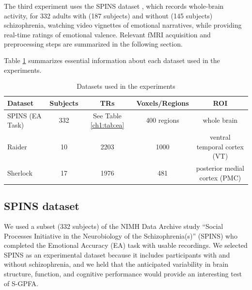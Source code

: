 The third experiment uses the SPINS dataset \cite{spins}, which records whole-brain activity, for 332 adults with (187 subjects) and without (145 subjects) schizophrenia, watching video vignettes of emotional narratives, while providing real-time ratings of emotional valence. Relevant fMRI acquisition and preprocessing steps are summarized in the following section.  

Table \ref{ch1:tab:datasets} summarizes essential information about each dataset used in the experiments.

\begin{table}[h!]
    \caption{Datasets used in the experiments}
    \label{ch1:tab:datasets}
    \centering \small
    \begin{tabular}{lcccc}
        \toprule
        \cmidrule(r){1-2}
        Dataset & Subjects  & TRs   & Voxels/Regions    & ROI\\
        \midrule
        SPINS (EA Task) \cite{spins} & 332   & See Table \ref{ch1:tab:ea}  & 400 regions \cite{schaefer2018local}  & whole brain \\
        Raider \cite{ha}  & 10    & 2203  & 1000   & ventral temporal cortex (VT) \\
        Sherlock\cite{sherlock}  & 17  & 1976   & 481 & posterior medial cortex (PMC) \\
        \bottomrule
    \end{tabular}
\end{table}


\subsection{SPINS dataset}
We used a subset (332 subjects) of the NIMH Data Archive study “Social Processes Initiative in the Neurobiology of the Schizophrenia(s)” (SPINS) \cite{spins} who completed the Emotional Accuracy (EA) task with usable recordings. We selected SPINS as an experimental dataset because it includes participants with and without schizophrenia, and we held that the anticipated variability in brain structure, function, and cognitive performance would provide an interesting test of S-GPFA.

